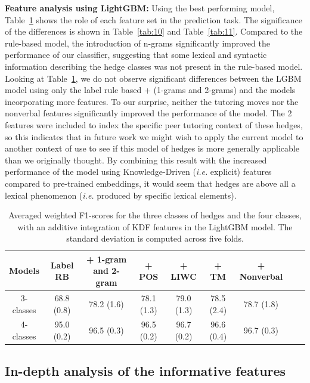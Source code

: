 \documentclass[11pt]{article}
\begin{document}
\noindent\textbf{Feature analysis using LightGBM:} Using the best performing model, Table~\ref{tab:5} shows the role of each feature set in the prediction task. The significance of the differences is shown in Table~\ref{tab:10} and Table~\ref{tab:11}. Compared to the rule-based model, the introduction of n-grams significantly improved the performance of our classifier, suggesting that some lexical and syntactic information describing the hedge classes was not present in the rule-based model. Looking at Table~\ref{tab:5}, we do not observe significant differences between the LGBM model using only the label rule based + (1-grams and 2-grams) and the models incorporating more features. To our surprise, neither the tutoring moves nor the nonverbal features significantly improved the performance of the model. The 2 features were included to index the specific peer tutoring context of these hedges, so this indicates that in future work we might wish to apply the current model to another context of use to see if this model of hedges is more generally applicable than we originally thought. By combining this result with the increased performance of the model using Knowledge-Driven (\textit{i.e.} explicit) features compared to pre-trained embeddings, it would seem that hedges are above all a lexical phenomenon (\textit{i.e.} produced by specific lexical elements).

\begin{table}[t]
  \tabcolsep=0.15cm
  \footnotesize
  \centering
  \begin{tabular}{c|cccccccc} \toprule
    Models & Label RB & + 1-gram and 2-gram & + POS & + LIWC & + TM  & + Nonverbal\\ \midrule
    3-classes & 68.8 (0.8) & 78.2 (1.6) & 78.1 (1.3) & 79.0 (1.3) & 78.5 (2.4) & 78.7 (1.8) \\ 
    \midrule
    4-classes & 95.0 (0.2) & 96.5 (0.3) & 96.5 (0.2) & 96.7 (0.2) & 96.6 (0.4) & 96.7 (0.3)\\
    \bottomrule
  \end{tabular}
  \caption{Averaged weighted F1-scores for the three classes of hedges and the four classes, with an additive integration of KDF features in the LightGBM model. The standard deviation is computed across five folds.}
  \label{tab:5}
\end{table}

\subsection{In-depth analysis of the informative features}
\end{document}
